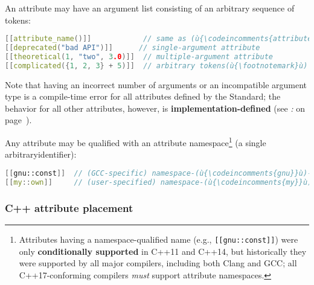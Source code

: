 \noindent An attribute may have an argument list consisting of an
arbitrary sequence of tokens:

\begin{lstlisting}[language=C++]
[[attribute_name()]]            // same as (ù{\codeincomments{attribute\_name}}ù)
[[deprecated("bad API")]]      // single-argument attribute
[[theoretical(1, "two", 3.0)]]  // multiple-argument attribute
[[complicated({1, 2, 3} + 5)]]  // arbitrary tokens(ù{\footnotemark}ù)
\end{lstlisting}

\noindent Note that having an incorrect number of arguments or an incompatible
argument type is a compile-time error for all  attributes defined by the Standard; %
the behavior for all other attributes,
 however, is
\textbf{implementation-defined} (see {\it{}:} {\it{}} on page~\pageref{unrecognized-attributes-have-implementation-defined-behavior}).

Any attribute may be qualified with an attribute namespace{\cprotect\footnote{Attributes
having a namespace-qualified name (e.g., \texttt{[[gnu::const]]}) were
only \textbf{conditionally supported} in C++11 and C++14, but
historically they were supported by all major compilers, including both
Clang and GCC; all C++17-conforming compilers \textit{must} support attribute namespaces.}} (a single arbitrary\linebreak[4] \mbox{identifier}):

\begin{lstlisting}[language=C++]
[[gnu::const]]  // (GCC-specific) namespace-(ù{\codeincomments{gnu}}ù)-qualified (ù{\codeincomments{const}}ù) attribute
[[my::own]]     // (user-specified) namespace-(ù{\codeincomments{my}}ù)-qualified (ù{\codeincomments{own}}ù) attribute
\end{lstlisting}


\subsubsection[C++ attribute placement]{C++ attribute placement}\label{c++-attribute-placement}

